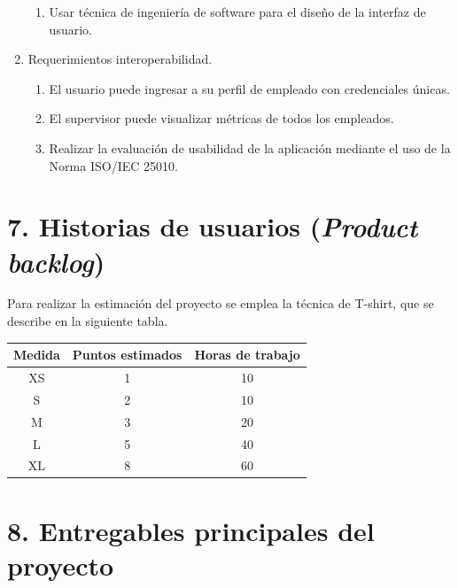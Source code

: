 \documentclass[
11pt, %
]{charter}
\begin{document}
\begin{enumerate}
\begin{enumerate}
			\item Usar técnica de ingeniería de software para el diseño de la interfaz de usuario.
		\end{enumerate}
	\item Requerimientos interoperabilidad.
			\begin{enumerate}
			\item El usuario puede ingresar a su perfil de empleado con credenciales únicas.
			\item El supervisor puede visualizar métricas de todos los empleados.
			\item Realizar la evaluación de usabilidad de la aplicación mediante el uso de la Norma ISO/IEC 25010.
		\end{enumerate}
\end{enumerate}



\section{7. Historias de usuarios (\textit{Product backlog})}
\label{sec:backlog}


Para realizar la estimación del proyecto se emplea la técnica de T-shirt, que se describe en la siguiente tabla.

\begin{table}[h!]
\centering
 \begin{tabular}{|c c c|} 
\hline
\rowcolor[HTML]{C0C0C0} 
Medida & Puntos estimados & Horas de trabajo	\\ \hline
XS     & 1               & 10  	  \\ \hline
S      & 2               & 10  	  \\ \hline
M      & 3               & 20    \\ \hline
L      & 5               & 40    \\ \hline
XL     & 8               & 60      \\ \hline
\end{tabular}
\end{table}


\section{8. Entregables principales del proyecto}
\label{sec:entregables}
\end{document}
